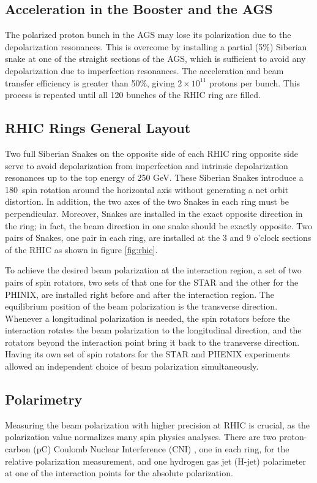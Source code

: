 \subsection{Acceleration in the Booster and the AGS}
The polarized proton bunch in the AGS may lose its polarization due to the  depolarization resonances. This is overcome by installing a partial (5\%) Siberian snake at one of the straight sections of the AGS, which is sufficient to avoid any depolarization due to imperfection resonances. The acceleration and beam transfer efficiency is greater than 50\%, giving $2\times 10^{11}$ protons per bunch. This process is repeated until all 120 bunches of the RHIC ring are filled. 

\subsection{RHIC Rings General Layout}
Two full Siberian Snakes on the opposite side of each RHIC ring opposite side serve to avoid depolarization from imperfection and intrinsic depolarization resonances up to the top energy of 250 GeV. These Siberian Snakes introduce a 180\textdegree\ spin rotation around the horizontal axis  without generating a net orbit distortion. In addition, the two axes of the two Snakes in each ring must be perpendicular. Moreover, Snakes are installed in the exact opposite direction in the ring; in fact, the beam direction in one snake should be exactly opposite. Two pairs of Snakes, one pair in each ring, are installed at the 3 and 9 o'clock sections of the RHIC as shown in figure \ref{fig:rhic}.

To achieve the desired beam polarization at the interaction region, a set of two pairs of spin rotators, two sets of that one for the STAR and the other for the PHINIX, are installed right before and after the interaction region. The equilibrium position of the beam polarization is the transverse direction. Whenever a longitudinal polarization is needed, the spin rotators before the interaction rotates the beam polarization to the longitudinal direction, and the rotators beyond the interaction point bring it back to the transverse direction. Having its own set of spin rotators for the STAR and PHENIX experiments allowed an independent choice of beam polarization simultaneously.   

\subsection{Polarimetry}
Measuring the beam polarization with higher precision at RHIC is crucial, as the polarization value normalizes many spin physics analyses. There are two proton-carbon (pC) Coulomb Nuclear Interference (CNI) \cite{KURITA2003C356}, one in each ring, for the relative polarization measurement, and one hydrogen gas jet (H-jet) polarimeter \cite{Zelenski:2005mz} at one of the interaction points for the absolute polarization. 

